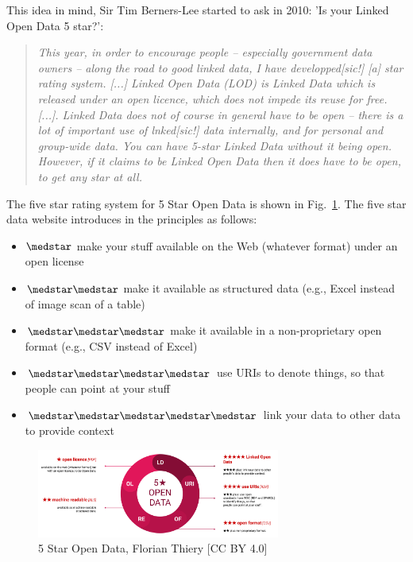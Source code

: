 \documentclass[twocolumn]{autart}
\begin{document}
This idea in mind, Sir Tim Berners-Lee started to ask in 2010: 'Is your Linked Open Data 5 star?':

\begin{quotation}
	\frqq\textit{This year, in order to encourage people -- especially government data owners -- along the road to good linked data, I have developped[sic!] [a] star rating system. [...] Linked \textit{Open} Data (LOD) is Linked Data which is released under an open licence, which does not impede its reuse for free. [...]. Linked Data does not of course in general have to be open -- there is a lot of important use of lnked[sic!] data internally, and for personal and group-wide data. You can have 5-star Linked Data without it being open. However, if it claims to be Linked Open Data then it does have to be open, to get any star at all.}\flqq\cite{berners-lee_linked_2006}
\end{quotation}

The five star rating system for 5 Star Open Data is shown in Fig.~\ref{5sd}. The five star data website\cite{hausenblas_5-sterne_2015} introduces in the principles as follows:

\begin{itemize}
	\item $\medstar$ make your stuff available on the Web (whatever format) under an open license
	\item $\medstar\medstar$ make it available as structured data (e.g., Excel instead of image scan of a table)
	\item $\medstar\medstar\medstar$ make it available in a non-proprietary open format (e.g., CSV instead of Excel)
	\item $\medstar\medstar\medstar\medstar$ use URIs to denote things, so that people can point at your stuff
	\item $\medstar\medstar\medstar\medstar\medstar$ link your data to other data to provide context
\end{itemize}

\begin{figure}[!htb]
\begin{center}
\includegraphics[width=8cm]{5_Star_Open_Data.png}
\caption{5 Star Open Data, Florian Thiery [CC BY 4.0]}
\label{5sd}
\end{center}
\end{figure}
\end{document}
